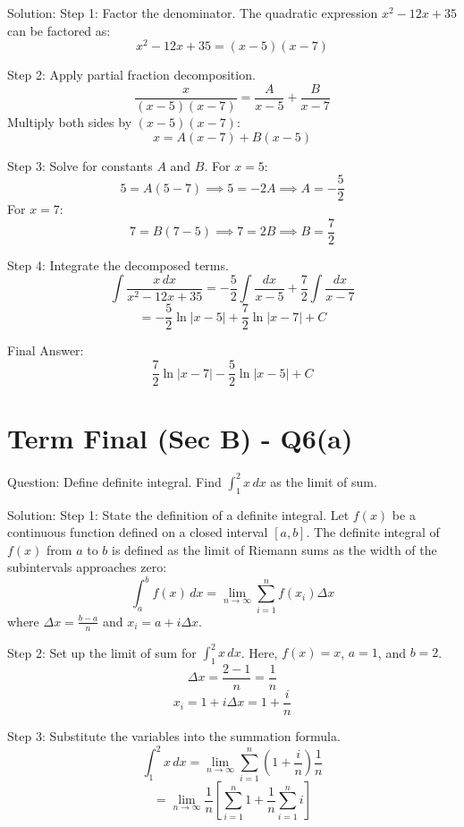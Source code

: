 \documentclass{article}
\begin{document}
Solution:
Step 1: Factor the denominator.
The quadratic expression \(x^2-12x+35\) can be factored as:
\[
x^2-12x+35 = (x-5)(x-7)
\]

Step 2: Apply partial fraction decomposition.
\[
\frac{x}{(x-5)(x-7)} = \frac{A}{x-5} + \frac{B}{x-7}
\]
Multiply both sides by \((x-5)(x-7)\):
\[
x = A(x-7) + B(x-5)
\]

Step 3: Solve for constants \(A\) and \(B\).
For \(x = 5\):
\[
5 = A(5-7) \implies 5 = -2A \implies A = -\frac{5}{2}
\]
For \(x = 7\):
\[
7 = B(7-5) \implies 7 = 2B \implies B = \frac{7}{2}
\]

Step 4: Integrate the decomposed terms.
\[
\int \frac{x \, dx}{x^2-12x+35} = -\frac{5}{2} \int \frac{dx}{x-5} + \frac{7}{2} \int \frac{dx}{x-7}
\]
\[
= -\frac{5}{2} \ln|x-5| + \frac{7}{2} \ln|x-7| + C
\]

Final Answer:
\[
\boxed{\frac{7}{2} \ln|x-7| - \frac{5}{2} \ln|x-5| + C}
\]

\section*{Term Final (Sec B) - Q6(a)}
Question:
Define definite integral. Find \(\int_1^2 x \, dx\) as the limit of sum.

Solution:
Step 1: State the definition of a definite integral.
Let \(f(x)\) be a continuous function defined on a closed interval \([a, b]\). The definite integral of \(f(x)\) from \(a\) to \(b\) is defined as the limit of Riemann sums as the width of the subintervals approaches zero:
\[
\int_a^b f(x) \, dx = \lim_{n \to \infty} \sum_{i=1}^{n} f(x_i) \Delta x
\]
where \(\Delta x = \frac{b-a}{n}\) and \(x_i = a + i\Delta x\).

Step 2: Set up the limit of sum for \(\int_1^2 x \, dx\).
Here, \(f(x) = x\), \(a = 1\), and \(b = 2\).
\[
\Delta x = \frac{2-1}{n} = \frac{1}{n}
\]
\[
x_i = 1 + i\Delta x = 1 + \frac{i}{n}
\]

Step 3: Substitute the variables into the summation formula.
\[
\int_1^2 x \, dx = \lim_{n \to \infty} \sum_{i=1}^{n} \left(1 + \frac{i}{n}\right) \frac{1}{n}
\]
\[
= \lim_{n \to \infty} \frac{1}{n} \left[ \sum_{i=1}^{n} 1 + \frac{1}{n} \sum_{i=1}^{n} i \right]
\]
\end{document}
